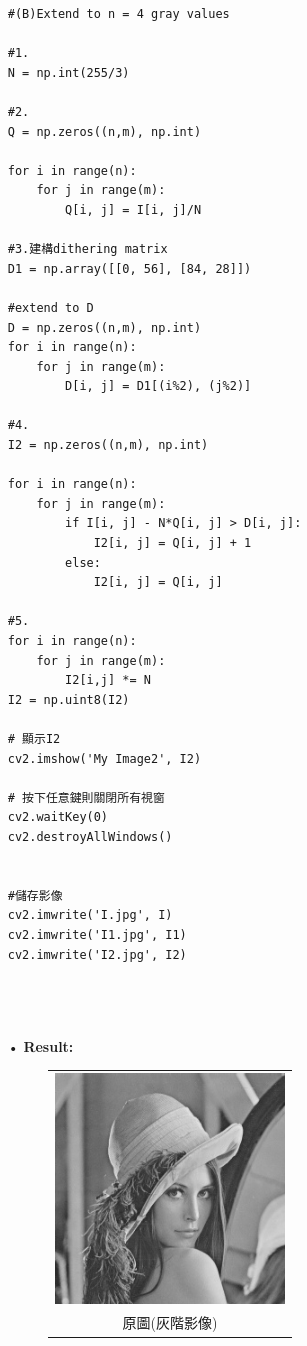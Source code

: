 \documentclass[12pt,a4paper]{article}
\begin{document}
\begin{enumerate}
\begin{lstlisting}
#(B)Extend to n = 4 gray values

#1.
N = np.int(255/3)

#2.
Q = np.zeros((n,m), np.int)

for i in range(n):
    for j in range(m):
        Q[i, j] = I[i, j]/N
        
#3.建構dithering matrix
D1 = np.array([[0, 56], [84, 28]])

#extend to D
D = np.zeros((n,m), np.int)
for i in range(n):
    for j in range(m):
        D[i, j] = D1[(i%2), (j%2)]

#4.
I2 = np.zeros((n,m), np.int)

for i in range(n):
    for j in range(m):
        if I[i, j] - N*Q[i, j] > D[i, j]:
            I2[i, j] = Q[i, j] + 1
        else:
            I2[i, j] = Q[i, j]

#5.
for i in range(n):
    for j in range(m):
        I2[i,j] *= N           
I2 = np.uint8(I2)

# 顯示I2
cv2.imshow('My Image2', I2)

# 按下任意鍵則關閉所有視窗
cv2.waitKey(0)
cv2.destroyAllWindows()


#儲存影像
cv2.imwrite('I.jpg', I)
cv2.imwrite('I1.jpg', I1)
cv2.imwrite('I2.jpg', I2)




\end{lstlisting}

\item[•]
{\bf Result:}
\begin{figure}[h]
\hspace*{10.5em}
\begin{tabular}{c}
\includegraphics[height=2.4in]{I.jpg}\\
原圖(灰階影像)
\end{tabular}
\end{figure} 


\end{enumerate}
\end{document}
